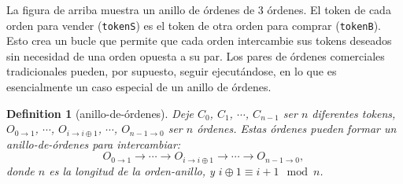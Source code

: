 \documentclass[UTF8,nofonts]{article}
\makeatletter
\newtheorem{definition}{Definition}[section]
\newenvironment{figurehere}
 {\def\@captype{figure}}
 {}
\makeatother
\begin{document}
\begin{multicols}{2}
\begin{center}
\begin{figurehere}

\caption{Un anillo de orden de 3 \'ordenes}
\label{fig:ring}
\end{figurehere}
\end{center}

La figura de arriba muestra un anillo de \'ordenes de 3 \'ordenes. El token de cada orden para vender (\verb|tokenS|) es el token de otra orden para comprar (\verb|tokenB|). Esto crea un bucle que permite que cada orden intercambie sus tokens deseados sin necesidad de una orden opuesta a su par. Los pares de \'ordenes comerciales tradicionales pueden, por supuesto, seguir ejecut\'andose, en lo que es esencialmente un caso especial de un anillo de \'ordenes.

\begin{definition}[anillo-de-\'ordenes] Deje $C_{0}$, $C_{1}$, $\cdots$, $C_{n-1}$ ser $n$ diferentes tokens, $O_{0\rightarrow 1}$, $\cdots$, $O_{i\rightarrow i\oplus 1}$, $\cdots$, $O_{n-1 \rightarrow 0}$ ser $n$ \'ordenes. Estas \'ordenes pueden formar un anillo-de-\'ordenes para intercambiar:
$$O_{0\rightarrow 1} \rightarrow \cdots \rightarrow O_{i\rightarrow i\oplus 1} \rightarrow \cdots \rightarrow O_{n-1\rightarrow 0} \text{, }$$
donde $n$ es la longitud de la orden-anillo, y $i\oplus 1 \equiv i+1 \mod n$.
\end{definition}


\end{multicols}
\end{document}
